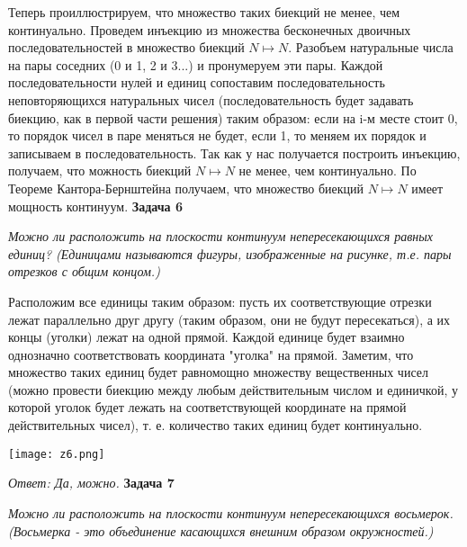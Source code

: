 \documentclass{article}
\begin{document}
Теперь проиллюстрируем, что множество таких биекций не менее, чем континуально. Проведем инъекцию из множества бесконечных двоичных последовательностей в множество биекций $N\mapsto N$. Разобъем натуральные числа на пары соседних (0 и 1, 2 и 3...) и пронумеруем эти пары. Каждой последовательности нулей и единиц сопоставим последовательность неповторяющихся натуральных чисел (последовательность будет задавать биекцию, как в первой части решения) таким образом: если на i-м месте стоит 0, то порядок чисел в паре меняться не будет, если 1, то меняем их порядок и записываем в последовательность. Так как у нас получается построить инъекцию, получаем, что можность биекций $N\mapsto N$ не менее, чем континуально. По Теореме Кантора-Бернштейна получаем, что множество биекций $N\mapsto N$ имеет мощность континуум.
\newline \newline
 \noindent \textbf{Задача 6}
\begin{center}
\textit{Можно ли расположить на плоскости континуум непересекающихся равных единиц? (Единицами называются фигуры, изображенные на рисунке, т.е. пары отрезков с общим концом.)}
\end{center}
Расположим все единицы таким образом: пусть их соответствующие отрезки лежат параллельно друг другу (таким образом, они не будут пересекаться), а их концы (уголки) лежат на одной прямой. Каждой единице будет взаимно однозначно соответствовать координата "уголка" на прямой. Заметим, что множество таких единиц будет равномощно множеству вещественных чисел (можно провести биекцию между любым действительным числом и единичкой, у которой уголок будет лежать на соответствующей координате на прямой действительных чисел), т. е. количество таких единиц будет континуально.
\newline
\begin{center}
 \texttt{[image: z6.png]}
\end{center}
\noindent \textit{Ответ: Да, можно.}
\newline \newline
 \noindent \textbf{Задача 7}
\begin{center}
\textit{Можно ли расположить на плоскости континуум непересекающихся восьмерок. (Восьмерка - это объединение касающихся внешним образом окружностей.)}
\end{center}
\end{document}
